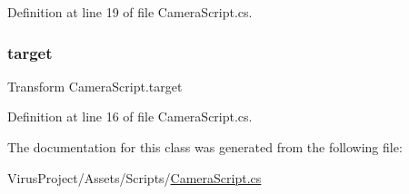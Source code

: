Definition at line 19 of file Camera\+Script.\+cs.

\hypertarget{class_camera_script_a0cb84b0b035c8ef0fd33a9698da77b27}{}\label{class_camera_script_a0cb84b0b035c8ef0fd33a9698da77b27} 
\subsubsection{\texorpdfstring{target}{target}}
{\footnotesize\ttfamily Transform Camera\+Script.\+target}



Definition at line 16 of file Camera\+Script.\+cs.



The documentation for this class was generated from the following file\+:\begin{DoxyCompactItemize}
\item 
Virus\+Project/\+Assets/\+Scripts/\hyperlink{_camera_script_8cs}{Camera\+Script.\+cs}\end{DoxyCompactItemize}
